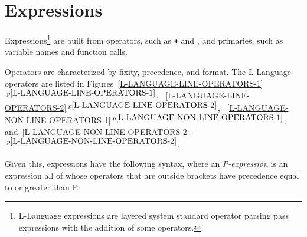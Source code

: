 \documentclass[12pt]{article}
\newcommand{\TT}[1]{{\tt \bfseries #1}}
\newcommand{\itemref}[1]{\ref{#1}$\,^{p\pageref{#1}}$}
\begin{document}
\section{Expressions}

Expressions\footnote{
L-Language expressions are
layered system standard operator parsing pass
expressions with the addition of some
operators.}
are built from operators, such as \TT{+} and \TT{*},
and primaries, such as variable names and function calls.

Operators are characterized by fixity, precedence, and format.
The L-Language operators are listed in
Figures~\itemref{L-LANGUAGE-LINE-OPERATORS-1},
~\itemref{L-LANGUAGE-LINE-OPERATORS-2},
~\itemref{L-LANGUAGE-NON-LINE-OPERATORS-1},
and~\itemref{L-LANGUAGE-NON-LINE-OPERATORS-2}.


Given this, expressions have the following syntax,
where an {\em P-expression}
is an expression all of whose operators that are outside brackets
have precedence equal to or greater than P:
\end{document}
